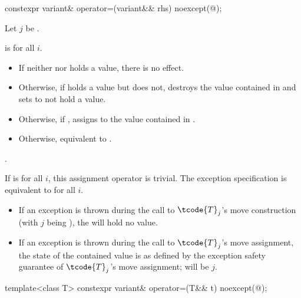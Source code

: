 %
\begin{itemdecl}
constexpr variant& operator=(variant&& rhs) noexcept(@\seebelow@);
\end{itemdecl}

\begin{itemdescr}
\pnum
Let $j$ be .

\pnum
\constraints
{}
 is
 for all $i$.

\pnum
\effects
\begin{itemize}
\item
If neither  nor  holds a value, there is no effect.
\item
Otherwise, if  holds a value but  does not, destroys the value
contained in  and sets  to not hold a value.
\item
Otherwise, if , assigns  to
the value contained in .
\item
Otherwise, equivalent to .
\end{itemize}

\pnum
\returns
{}.

\pnum
\remarks
If 
is  for all $i$, this assignment operator is trivial.
The exception specification is equivalent to
 for all $i$.
\begin{itemize}
\item If an exception is thrown during the call to $\tcode{T}_j$'s move construction
(with $j$ being ), the  will hold no value.
\item If an exception is thrown during the call to $\tcode{T}_j$'s move assignment,
the state of the contained value is as defined by the exception safety
guarantee of $\tcode{T}_j$'s move assignment;  will be $j$.
\end{itemize}
\end{itemdescr}

%
\begin{itemdecl}
template<class T> constexpr variant& operator=(T&& t) noexcept(@\seebelow@);
\end{itemdecl}

